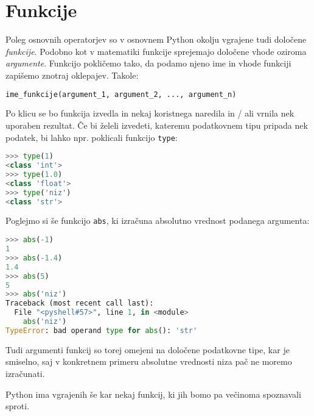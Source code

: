 \section{Funkcije}
Poleg osnovnih operatorjev so v osnovnem Python okolju vgrajene tudi določene \emph{funkcije}. Podobno kot v matematiki funkcije sprejemajo določene vhode oziroma \emph{argumente}. Funkcijo pokličemo tako, da podamo njeno ime in vhode funkciji zapišemo znotraj oklepajev. Takole:
\begin{lstlisting}[language=Python]
ime_funkcije(argument_1, argument_2, ..., argument_n)
\end{lstlisting}
Po klicu se bo funkcija izvedla in nekaj koristnega naredila in / ali vrnila nek uporaben rezultat. Če bi želeli izvedeti, kateremu podatkovnem tipu pripada nek podatek, bi lahko npr. poklicali funkcijo \texttt{type}:
\begin{lstlisting}[language=Python]
>>> type(1)
<class 'int'>
>>> type(1.0)
<class 'float'>
>>> type('niz')
<class 'str'>
\end{lstlisting}
Poglejmo si še funkcijo \texttt{abs}, ki izračuna absolutno vrednost podanega argumenta:
\begin{lstlisting}[language=Python]
>>> abs(-1)
1
>>> abs(-1.4)
1.4
>>> abs(5)
5
>>> abs('niz')
Traceback (most recent call last):
  File "<pyshell#57>", line 1, in <module>
    abs('niz')
TypeError: bad operand type for abs(): 'str'
\end{lstlisting}
Tudi argumenti funkcij so torej omejeni na določene podatkovne tipe, kar je smiselno, saj v konkretnem primeru absolutne vrednosti niza pač ne moremo izračunati.

Python ima vgrajenih še kar nekaj funkcij, ki jih bomo pa večinoma spoznavali sproti. 


